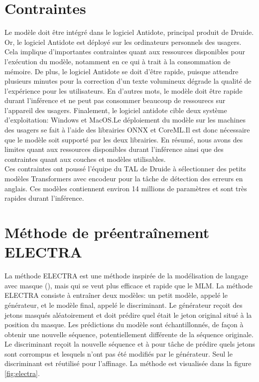\documentclass[12pt,twoside,maitrise]{dms}
\theoremstyle{definition}
\numberwithin{equation}{section}
\numberwithin{table}{chapter}
\numberwithin{figure}{chapter}
\begin{document}
\section{Contraintes}
Le modèle doit être intégré dans le logiciel Antidote, principal produit de
Druide. Or, le logiciel Antidote est déployé sur les ordinateurs personnels des
usagers. Cela implique d'importantes contraintes quant aux ressources
disponibles pour l'exécution du modèle, notamment en ce qui à trait à la
consommation de mémoire. De plus, le logiciel Antidote se doit d'être rapide,
puisque attendre plusieurs minutes pour la correction d'un texte volumineux
dégrade la qualité de l'expérience pour les utilisateurs. En d'autres mots, le
modèle doit être rapide durant l'inférence et ne peut pas consommer beaucoup de
ressourecs sur l'appareil des usagers. Finalement, le logiciel antidote cible
deux système d'exploitation: Windows et MacOS.\@ Le déploiement du modèle sur
les machines des usagers se fait à l'aide des librairies ONNX\cite{onnxruntime}
et CoreML.\@ Il est donc nécessaire que le modèle soit supporté par les deux
librairies. En résumé, nous avons des limites quant aux ressources disponibles
durant l'inférence ainsi que des contraintes quant aux couches et modèles
utilisables.\\

Ces contraintes ont poussé l'équipe du TAL de Druide à sélectionner des petits
modèles Transformers\cite{vaswani2023attentionneed} avec encodeur pour la tâche
de détection des erreurs en anglais. Ces modèles contiennent environ 14
millions de paramètres et sont très rapides durant l'inférence.

\section{Méthode de préentraînement ELECTRA}

La méthode ELECTRA\cite{clark2020electrapretrainingtextencoders} est une
méthode inspirée de la modélisation de langage avec masque (), mais
qui se veut plus efficace et rapide que le MLM. La méthode ELECTRA consiste à
entraîner deux modèles: un petit modèle, appelé le générateur, et le modèle
final, appelé le discriminant. Le générateur reçoit des jetons masqués
aléatoirement et doit prédire quel était le jeton original situé à la position
du masque. Les prédictions du modèle sont échantillonnés, de façon à obtenir
une nouvelle séquence, potentiellement différente de la séquence originale. Le
discriminant reçoit la nouvelle séquence et à pour tâche de prédire quels
jetons sont corrompus et lesquels n'ont pas été modifiés par le générateur.
Seul le discriminant est réutilisé pour l'affinage. La méthode est visualisée
dans la figure \ref{fig:electra}.
\\
\end{document}
